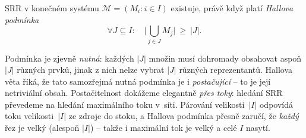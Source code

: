 \documentclass[11pt,a4paper]{article}
\newcommand{\Mcal}{\mathcal{M}}
\begin{document}
\begin{veta}
SRR v konečném systému $\Mcal=(M_i:i\in I)$ existuje, právě když platí \emph{Hallova podmínka}
\[
\forall J\subseteq I:\quad \Big|\bigcup_{j\in J}M_j\Big|\ \ge\ |J|.
\]
\end{veta}


\begin{intuice}
Podmínka je zjevně \emph{nutná}: každých $|J|$ množin musí dohromady obsahovat aspoň $|J|$ různých prvků, jinak z nich nelze vybrat $|J|$ různých reprezentantů. Hallova věta říká, že tato samozřejmá nutná podmínka je i \emph{postačující} -- to je její netriviální obsah. Postačitelnost dokážeme elegantně \emph{přes toky}: hledání SRR převedeme na hledání maximálního toku v~síti. Párování velikosti~$|I|$ odpovídá toku velikosti~$|I|$ ze zdroje do stoku, a Hallova podmínka přesně zaručí, že \emph{každý} řez je velký (alespoň $|I|$) -- takže i maximální tok je velký a celé $I$ nasytí.
\end{intuice}
\end{document}
